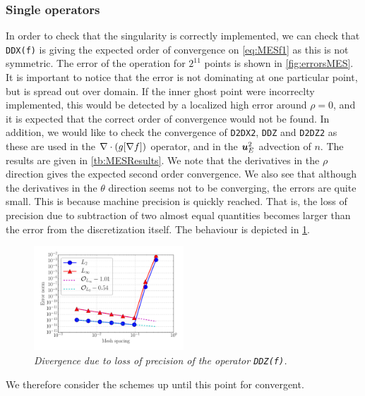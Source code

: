 \subsubsection{Single operators}
\label{sec:singleOp}
%
In order to check that the singularity is correctly implemented, we can check that \texttt{DDX(f)} is giving the expected order of convergence on \cref{eq:MESf1} as this is not symmetric.
The error of the operation for $2^{11}$ points is shown in \cref{fig:errorsMES}.
It is important to notice that the error is not dominating at one particular point, but is spread out over domain.
If the inner ghost point were incorreclty implemented, this would be detected by a localized high error around $\rho=0$, and it is expected that the correct order of convergence would not be found.
In addition, we would like to check the convergence of \texttt{D2DX2}, \texttt{DDZ} and \texttt{D2DZ2} as these are used in the $\nabla\cdot\left(g[\nabla f]\right)$ operator, and in the $\boldsymbol{u}_E^2$ advection of $n$.
The results are given in \cref{tb:MESResults}.
We note that the derivatives in the $\rho$ direction gives the expected second order convergence.
We also see that although the derivatives in the $\theta$ direction seems not to be converging, the errors are quite small.
This is because machine precision is quickly reached.
That is, the loss of precision due to subtraction of two almost equal quantities becomes larger than the error from the discretization itself.
The behaviour is depicted in \cref{fig:divDDZ}.
%
\begin{figure}[htb]
    \centering
    \includegraphics[width=0.5\textwidth]{fig/divDDZ}
    \caption{\textit{
            Divergence due to loss of precision of the operator \texttt{DDZ(f)}.
        }}
    \label{fig:divDDZ}
\end{figure}
%
We therefore consider the schemes up until this point for convergent.

